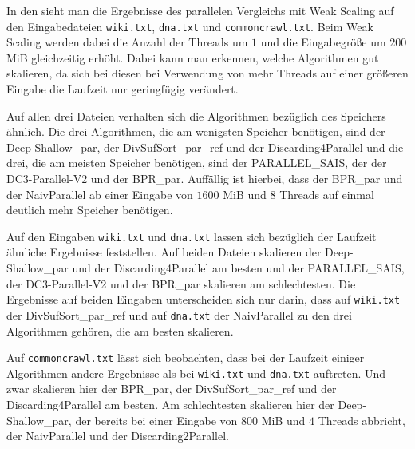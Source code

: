 In  den  sieht man die Ergebnisse des parallelen Vergleichs mit Weak Scaling auf den Eingabedateien \texttt{wiki.txt}, \texttt{dna.txt} und \texttt{commoncrawl.txt}. Beim Weak Scaling werden dabei die Anzahl der Threads um $1$ und die Eingabegröße um $200$ MiB gleichzeitig erhöht. Dabei kann man erkennen, welche Algorithmen gut skalieren, da sich bei diesen bei Verwendung von mehr Threads auf einer größeren Eingabe die Laufzeit nur geringfügig verändert. \par
Auf allen drei Dateien verhalten sich die Algorithmen bezüglich des Speichers ähnlich. Die drei Algorithmen, die am wenigsten Speicher benötigen, sind der Deep-Shallow\_par, der DivSufSort\_par\_ref und der Discarding4Parallel und die drei, die am meisten Speicher benötigen, sind der PARALLEL\-\_SAIS, der der DC3-Parallel-V2 und der BPR\_par. Auffällig ist hierbei, dass der BPR\_par und der NaivParallel ab einer Eingabe von $1600$ MiB und $8$ Threads auf einmal deutlich mehr Speicher benötigen. \par
Auf den Eingaben \texttt{wiki.txt} und \texttt{dna.txt} lassen sich bezüglich der Laufzeit ähnliche Ergebnisse feststellen. Auf beiden Dateien skalieren der Deep-Shallow\_par und der Discarding4Parallel am besten und der PARALLEL\-\_SAIS, der DC3-Parallel-V2 und der BPR\_par skalieren am schlechtesten. Die Ergebnisse auf beiden Eingaben unterscheiden sich nur darin, dass auf \texttt{wiki.txt} der DivSufSort\_par\_ref und auf \texttt{dna.txt} der NaivParallel zu den drei Algorithmen gehören, die am besten skalieren. \par
Auf \texttt{commoncrawl.txt} lässt sich beobachten, dass bei der Laufzeit einiger Algorithmen andere Ergebnisse als bei  \texttt{wiki.txt} und \texttt{dna.txt} auftreten. Und zwar skalieren hier der BPR\_par, der DivSufSort\_par\_ref und der Discarding4Parallel am besten. Am schlechtesten skalieren hier der Deep-Shallow\_par, der bereits bei einer Eingabe von $800$ MiB und $4$ Threads abbricht, der NaivParallel und der Discarding2Parallel. \par
